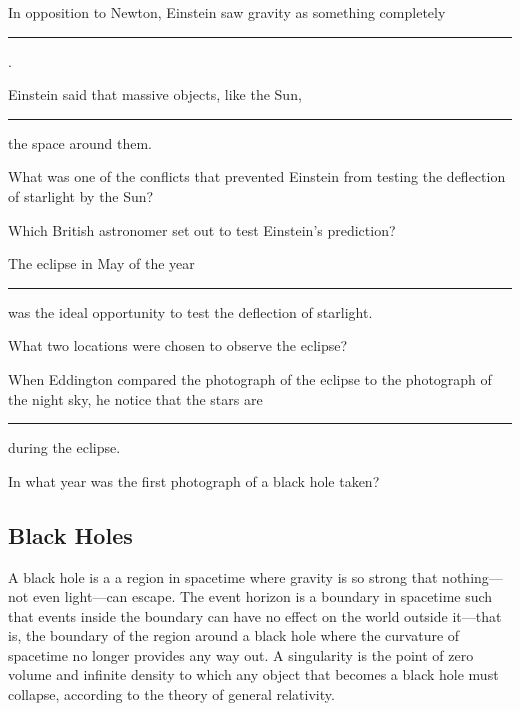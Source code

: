 \documentclass{article}
\numberwithin{equation}{section}
\numberwithin{figure}{section}
\begin{document}

\begin{exercise}
    In opposition to Newton, Einstein saw gravity as something completely \rule{2cm}{0.15mm}. 
\end{exercise}

\begin{exercise}
    Einstein said that massive objects, like the Sun, \rule{2cm}{0.15mm} the space around them.
\end{exercise}

\begin{exercise}
    What was one of the conflicts that prevented Einstein from testing the deflection of starlight by the Sun?
\end{exercise}

\begin{exercise}
    Which British astronomer set out to test Einstein's prediction?
\end{exercise}

\begin{exercise}
    The eclipse in May of the year \rule{2cm}{0.15mm} was the ideal opportunity to test the deflection of starlight.
\end{exercise}

\begin{exercise}
    What two locations were chosen to observe the eclipse?
\end{exercise}

\begin{exercise}
    When Eddington compared the photograph of the eclipse to the photograph of the night sky, he notice that the stars are \rule{2cm}{0.15mm} during the eclipse.
\end{exercise}

\begin{exercise}
    In what year was the first photograph of a black hole taken?
\end{exercise}

\clearpage

\subsection{Black Holes}

A \gls{black hole} is a a region in spacetime where gravity is so strong that nothing---not even light---can escape. The \gls{event horizon} is a boundary in spacetime such that events inside the boundary can have no effect on the world outside it---that is, the boundary of the region around a black hole where the curvature of spacetime no longer provides any way out. A \gls{singularity} is the point of zero volume and infinite density to which any object that becomes a black hole must collapse, according to the theory of general relativity.
\end{document}
